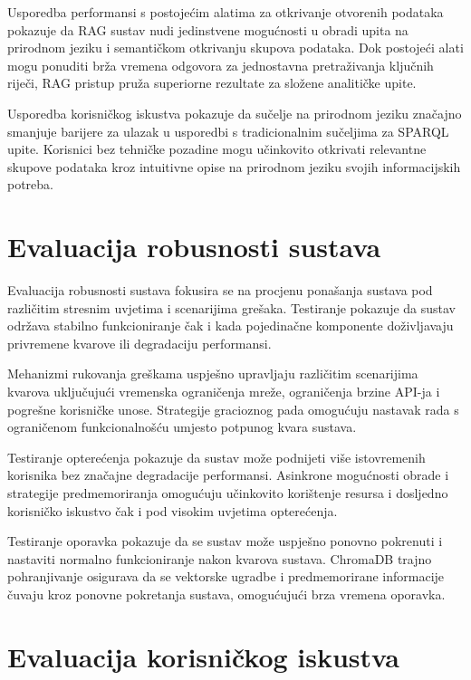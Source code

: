 Usporedba performansi s postojećim alatima za otkrivanje otvorenih podataka pokazuje da RAG sustav nudi jedinstvene mogućnosti u obradi upita na prirodnom jeziku i semantičkom otkrivanju skupova podataka. Dok postojeći alati mogu ponuditi brža vremena odgovora za jednostavna pretraživanja ključnih riječi, RAG pristup pruža superiorne rezultate za složene analitičke upite.

Usporedba korisničkog iskustva pokazuje da sučelje na prirodnom jeziku značajno smanjuje barijere za ulazak u usporedbi s tradicionalnim sučeljima za SPARQL upite. Korisnici bez tehničke pozadine mogu učinkovito otkrivati relevantne skupove podataka kroz intuitivne opise na prirodnom jeziku svojih informacijskih potreba.

\section{Evaluacija robusnosti sustava}
\label{sec:robustness_evaluation}

Evaluacija robusnosti sustava fokusira se na procjenu ponašanja sustava pod različitim stresnim uvjetima i scenarijima grešaka. Testiranje pokazuje da sustav održava stabilno funkcioniranje čak i kada pojedinačne komponente doživljavaju privremene kvarove ili degradaciju performansi.

Mehanizmi rukovanja greškama uspješno upravljaju različitim scenarijima kvarova uključujući vremenska ograničenja mreže, ograničenja brzine API-ja i pogrešne korisničke unose. Strategije gracioznog pada omogućuju nastavak rada s ograničenom funkcionalnošću umjesto potpunog kvara sustava.

Testiranje opterećenja pokazuje da sustav može podnijeti više istovremenih korisnika bez značajne degradacije performansi. Asinkrone mogućnosti obrade i strategije predmemoriranja omogućuju učinkovito korištenje resursa i dosljedno korisničko iskustvo čak i pod visokim uvjetima opterećenja.

Testiranje oporavka pokazuje da se sustav može uspješno ponovno pokrenuti i nastaviti normalno funkcioniranje nakon kvarova sustava. ChromaDB trajno pohranjivanje osigurava da se vektorske ugradbe i predmemorirane informacije čuvaju kroz ponovne pokretanja sustava, omogućujući brza vremena oporavka.

\section{Evaluacija korisničkog iskustva}
\label{sec:user_experience_evaluation}

